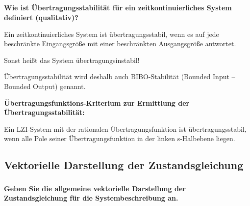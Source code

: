 \subsection{}
\textbf{Wie ist Übertragungsstabilität für ein zeitkontinuierliches System definiert (qualitativ)?}

Ein zeitkontinuierliches System ist übertragungsstabil, wenn es auf jede beschränkte Eingangsgröße mit einer beschränkten Ausgangsgröße antwortet.

Sonst heißt das System übertragungsinstabil!

Übertragungsstabilität wird deshalb auch BIBO-Stabilität (Bounded Input – Bounded Output) genannt.

\textbf{Übertragungsfunktions-Kriterium zur Ermittlung der Übertragungsstabilität:}

Ein LZI-System mit der rationalen Übertragungsfunktion ist übertragungsstabil, wenn alle Pole seiner Übertragungsfunktion in der linken s-Halbebene liegen.
\subsection{Vektorielle Darstellung der Zustandsgleichung}
\subsubsection{}
\textbf{Geben Sie die allgemeine vektorielle Darstellung der Zustandsgleichung für die Systembeschreibung an.}

